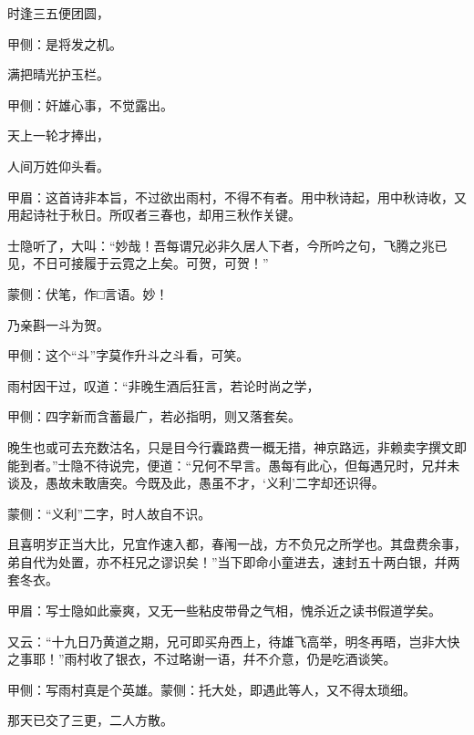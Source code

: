 \begin{poem}
    \begin{pl}时逢三五便团圆，\end{pl}\begin{note}甲侧：是将发之机。\end{note}

    \begin{pl}满把晴光护玉栏。\end{pl}\begin{note}甲侧：奸雄心事，不觉露出。\end{note}

    \begin{pl}天上一轮才捧出，\end{pl}

    \begin{pl}人间万姓仰头看。\end{pl}\begin{note}甲眉：这首诗非本旨，不过欲出雨村，不得不有者。用中秋诗起，用中秋诗收，又用起诗社于秋日。所叹者三春也，却用三秋作关键。\end{note}
\end{poem}


\begin{parag}
    士隐听了，大叫：“妙哉！吾每谓兄必非久居人下者，今所吟之句，飞腾之兆已见，不日可接履于云霓之上矣。可贺，可贺！”\begin{note}蒙侧：伏笔，作□言语。妙！\end{note}乃亲斟一斗为贺。\begin{note}甲侧：这个“斗”字莫作升斗之斗看，可笑。\end{note}雨村因干过，叹道：“非晚生酒后狂言，若论时尚之学，\begin{note}甲侧：四字新而含蓄最广，若必指明，则又落套矣。\end{note}晚生也或可去充数沽名，只是目今行囊路费一概无措，神京路远，非赖卖字撰文即能到者。”士隐不待说完，便道：“兄何不早言。愚每有此心，但每遇兄时，兄幷未谈及，愚故未敢唐突。今既及此，愚虽不才，‘义利’二字却还识得。\begin{note}蒙侧：“义利”二字，时人故自不识。\end{note}且喜明岁正当大比，兄宜作速入都，春闱一战，方不负兄之所学也。其盘费余事，弟自代为处置，亦不枉兄之谬识矣！”当下即命小童进去，速封五十两白银，幷两套冬衣。\begin{note}甲眉：写士隐如此豪爽，又无一些粘皮带骨之气相，愧杀近之读书假道学矣。\end{note}又云：“十九日乃黄道之期，兄可即买舟西上，待雄飞高举，明冬再晤，岂非大快之事耶！”雨村收了银衣，不过略谢一语，幷不介意，仍是吃酒谈笑。\begin{note}甲侧：写雨村真是个英雄。蒙侧：托大处，即遇此等人，又不得太琐细。\end{note}那天已交了三更，二人方散。
\end{parag}


